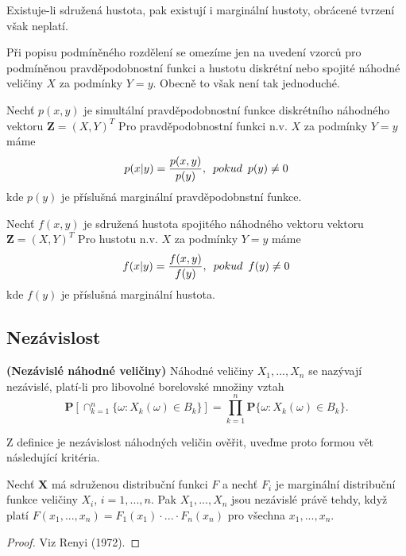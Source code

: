 \begin{remark}
Existuje-li sdružená hustota, pak existují i marginální hustoty, obrácené tvrzení však neplatí.
\end{remark}

Při popisu podmíněného rozdělení se omezíme jen na uvedení vzorců  pro podmíněnou pravděpodobnostní funkci a hustotu diskrétní nebo spojité náhodné veličiny $X$ za podmínky $Y = y$. Obecně to však není tak jednoduché.


Nechť $p(x,y)$ je simultální pravděpodobnostní funkce diskrétního náhodného vektoru $\textbf{Z} = (X, Y)^{T}$ Pro pravděpodobnostní funkci n.v. $X$ za podmínky $Y = y$ máme 
\begin{equation}
p(x|y) = \frac{p(x,y)}{p(y)}, \enskip pokud \enskip p(y) \neq 0
\end{equation}
kde $p(y)$ je příslušná marginální pravděpodobnstní funkce.

Nechť $f(x,y)$ je sdružená hustota spojitého náhodného vektoru vektoru $\textbf{Z} = (X, Y)^{T}$ Pro hustotu n.v. $X$ za podmínky $Y = y$ máme 
\begin{equation}
f(x|y) = \frac{f(x,y)}{f(y)}, \enskip pokud \enskip f(y) \neq 0
\end{equation}
kde $f(y)$ je příslušná marginální hustota.

\subsection{Nezávislost}
\begin{definition}{\textbf{(Nezávislé náhodné veličiny)}}
Náhodné veličiny $X_{1}, ..., X_{n}$ se nazývají nezávislé, platí-li pro libovolné borelovské množiny vztah
\begin{equation}
\textbf{P}[\cap_{k=1}^{n}\lbrace \omega : X_{k}(\omega) \in B_{k}\rbrace] = \prod_{k = 1}^{n} \textbf{P}\lbrace \omega : X_{k}(\omega) \in B_{k} \rbrace.
\end{equation}
\end{definition}

Z definice je nezávislost náhodných veličin ověřit, uveďme proto formou vět následující kritéria.
\begin{theorem}\label{Kriterium1}
Nechť $\textbf{X}$ má sdruženou distribuční funkci $F$ a nechť $F_{i}$ je marginální distribuční funkce veličiny $X_{i}$, $i = 1, ..., n$. Pak $X_{1}, ..., X_{n}$ jsou nezávislé právě tehdy, když platí $F(x_{1}, ..., x_{n}) = F_{1}(x_{1})\cdot ... \cdot F_{n}(x_{n})$ pro všechna $x_{1}, ..., x_{n}$.
\end{theorem}
\begin{proof}
Viz Renyi (1972).
\end{proof}

